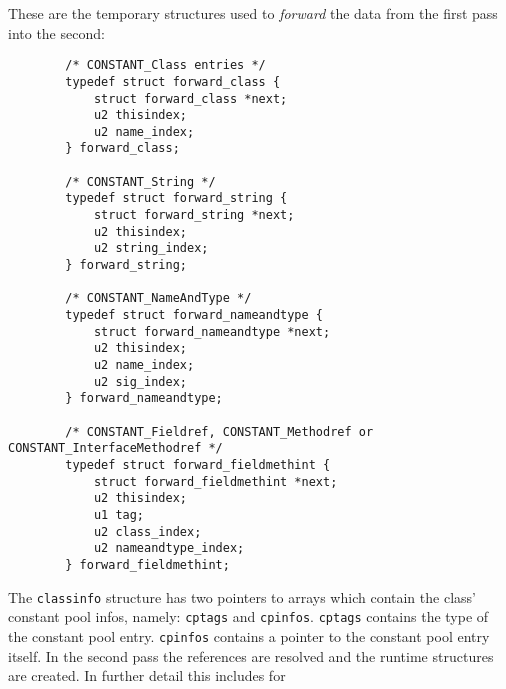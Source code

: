 These are the temporary structures used to \textit{forward} the data
from the first pass into the second:

\begin{verbatim}
        /* CONSTANT_Class entries */
        typedef struct forward_class {
            struct forward_class *next;
            u2 thisindex;
            u2 name_index;
        } forward_class;

        /* CONSTANT_String */
        typedef struct forward_string {
            struct forward_string *next;
            u2 thisindex;
            u2 string_index;
        } forward_string;

        /* CONSTANT_NameAndType */
        typedef struct forward_nameandtype {
            struct forward_nameandtype *next;
            u2 thisindex;
            u2 name_index;
            u2 sig_index;
        } forward_nameandtype;

        /* CONSTANT_Fieldref, CONSTANT_Methodref or CONSTANT_InterfaceMethodref */
        typedef struct forward_fieldmethint {
            struct forward_fieldmethint *next;
            u2 thisindex;
            u1 tag;
            u2 class_index;
            u2 nameandtype_index;
        } forward_fieldmethint;
\end{verbatim}

The \texttt{classinfo} structure has two pointers to arrays which
contain the class' constant pool infos, namely: \texttt{cptags} and
\texttt{cpinfos}. \texttt{cptags} contains the type of the constant
pool entry. \texttt{cpinfos} contains a pointer to the constant pool
entry itself. In the second pass the references are resolved and the
runtime structures are created. In further detail this includes for

